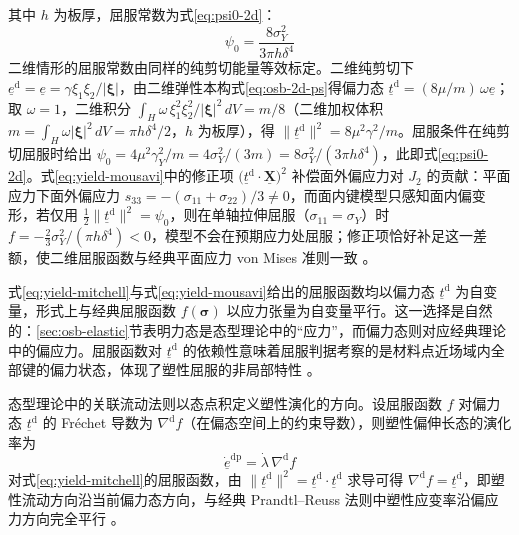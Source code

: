 其中 $h$ 为板厚，屈服常数为式\eqref{eq:psi0-2d}：
\begin{equation}
  \psi_{0}=\frac{8\sigma_{Y}^{2}}{3\pi h\delta^{4}}
  \label{eq:psi0-2d}
\end{equation}
二维情形的屈服常数由同样的纯剪切能量等效标定。二维纯剪切下 $\underline{e}^{\mathrm{d}}=\underline{e}=\gamma\xi_{1}\xi_{2}/|\boldsymbol{\xi}|$，由二维弹性本构式\eqref{eq:osb-2d-ps}得偏力态 $\underline{t}^{\mathrm{d}}=(8\mu/m)\,\omega\underline{e}$；取 $\omega=1$，二维积分 $\int_{H}\omega\,\xi_{1}^{2}\xi_{2}^{2}/|\boldsymbol{\xi}|^{2}\,dV=m/8$（二维加权体积 $m=\int_{H}\omega|\boldsymbol{\xi}|^{2}\,dV=\pi h\delta^{4}/2$，$h$ 为板厚），得 $\|\underline{t}^{\mathrm{d}}\|^{2}=8\mu^{2}\gamma^{2}/m$。屈服条件在纯剪切屈服时给出 $\psi_{0}=4\mu^{2}\gamma_{Y}^{2}/m=4\sigma_{Y}^{2}/(3m)=8\sigma_{Y}^{2}/(3\pi h\delta^{4})$，此即式\eqref{eq:psi0-2d}。式\eqref{eq:yield-mousavi}中的修正项 $\bigl(\underline{t}^{\mathrm{d}}\cdot\underline{\mathbf{X}}\bigr)^{2}$ 补偿面外偏应力对 $J_{2}$ 的贡献：平面应力下面外偏应力 $s_{33}=-(\sigma_{11}+\sigma_{22})/3\neq 0$，而面内键模型只感知面内偏变形，若仅用 $\tfrac{1}{2}\|\underline{t}^{\mathrm{d}}\|^{2}=\psi_{0}$，则在单轴拉伸屈服（$\sigma_{11}=\sigma_{Y}$）时 $f=-\tfrac{2}{3}\sigma_{Y}^{2}/(\pi h\delta^{4})<0$，模型不会在预期应力处屈服；修正项恰好补足这一差额，使二维屈服函数与经典平面应力 von Mises 准则一致 \cite{Mousavi2021}。

\begin{remark}
  式\eqref{eq:yield-mitchell}与式\eqref{eq:yield-mousavi}给出的屈服函数均以偏力态 $\underline{t}^{\mathrm{d}}$ 为自变量，形式上与经典屈服函数 $f(\boldsymbol{\sigma})$ 以应力张量为自变量平行。这一选择是自然的：\ref{sec:osb-elastic}节表明力态是态型理论中的“应力”，而偏力态则对应经典理论中的偏应力。屈服函数对 $\underline{t}^{\mathrm{d}}$ 的依赖性意味着屈服判据考察的是材料点近场域内全部键的偏力状态，体现了塑性屈服的非局部特性 \cite{Mitchell2011,Mousavi2021}。
\end{remark}

态型理论中的关联流动法则以态点积定义塑性演化的方向。设屈服函数 $f$ 对偏力态 $\underline{t}^{\mathrm{d}}$ 的 Fréchet 导数为 $\nabla^{\mathrm{d}} f$（在偏态空间上的约束导数），则塑性偏伸长态的演化率为
\begin{equation}
  \dot{\underline{e}}^{\mathrm{dp}}=\dot{\lambda}\,\nabla^{\mathrm{d}} f
  \label{eq:pd-flow-rule}
\end{equation}
对式\eqref{eq:yield-mitchell}的屈服函数，由 $\|\underline{t}^{\mathrm{d}}\|^{2}=\underline{t}^{\mathrm{d}}\cdot\underline{t}^{\mathrm{d}}$ 求导可得 $\nabla^{\mathrm{d}} f=\underline{t}^{\mathrm{d}}$，即塑性流动方向沿当前偏力态方向，与经典 Prandtl–Reuss 法则中塑性应变率沿偏应力方向完全平行 \cite{Mitchell2011,Mousavi2021}。

